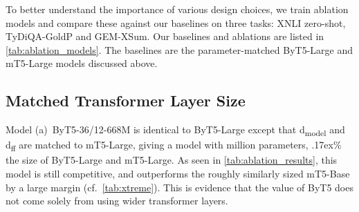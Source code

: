 \documentclass[11pt,a4paper]{article}
\newcommand{\bettertilde}{\raise.17ex\hbox{}}
\begin{document}
\begin{table}[t!]
\centering
{}
\caption{Models used in our ablation study.}
\label{tab:ablation_models}
\end{table} 
To better understand the importance of various design choices, we train ablation models and compare these against our baselines on three tasks: XNLI zero-shot, TyDiQA-GoldP and \mbox{GEM-XSum}. Our baselines and ablations are listed in \cref{tab:ablation_models}. The baselines are the parameter-matched ByT5-Large and mT5-Large models discussed above.

\subsection{Matched Transformer Layer Size}

Model (a)~ByT5-36/12-668M is identical to ByT5-Large except that d\textsubscript{model} and d\textsubscript{ff} are matched to \mbox{mT5-Large}, giving a model with  million parameters, \bettertilde{}\% the size of \mbox{ByT5-Large} and \mbox{mT5-Large}. As seen in \cref{tab:ablation_results}, this model is still competitive, and outperforms the roughly similarly sized \mbox{mT5-Base} by a large margin (cf.~\cref{tab:xtreme}). This is evidence that the value of ByT5 does not come solely from using wider transformer layers.
\end{document}
